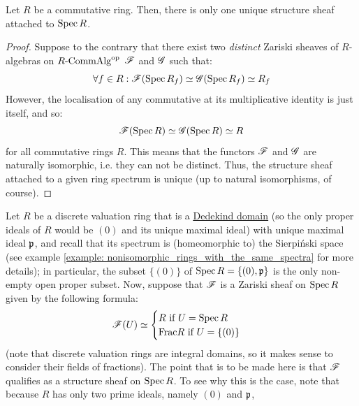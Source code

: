             \begin{proposition} \label{prop: structure_sheaf_uniqueness}
                Let $R$ be a commutative ring. Then, there is only one unique structure sheaf attached to $\operatorname{Spec} R$. 
            \end{proposition}
                \begin{proof}
                    Suppose to the contrary that there exist two \textit{distinct} Zariski sheaves of $R$-algebras on $R\text{-}\mathrm{Comm}\mathrm{Alg}^{\mathrm{op}}$ $\mathscr{F}$ and $\mathscr{G}$ such that:
                        $$\forall f \in R: \mathscr{F}(\operatorname{Spec} R_f) \simeq \mathscr{G}(\operatorname{Spec} R_f) \simeq R_f$$
                    However, the localisation of any commutative at its multiplicative identity is just itself, and so:
                        $$\mathscr{F}(\operatorname{Spec} R) \simeq \mathscr{G}(\operatorname{Spec} R) \simeq R$$
                    for all commutative rings $R$. This means that the functors $\mathscr{F}$ and $\mathscr{G}$ are naturally isomorphic, i.e. they can not be distinct. Thus, the structure sheaf attached to a given ring spectrum is unique (up to natural isomorphisms, of course).
                \end{proof}
                
            \begin{example}
                Let $R$ be a discrete valuation ring that is a \href{https://en.wikipedia.org/wiki/Dedekind_domain}{\underline{Dedekind domain}} (so the only proper ideals of $R$ would be $(0)$ and its unique maximal ideal) with unique maximal ideal $\mathfrak{p}$, and recall that its spectrum is (homeomorphic to) the Sierpi\'nski space (see example \ref{example: nonisomorphic_rings_with_the_same_spectra} for more details); in particular, the subset $\{(0)\}$ of $\operatorname{Spec} R = \{(0), \mathfrak{p}\}$ is the only non-empty open proper subset. Now, suppose that $\mathscr{F}$ is a Zariski sheaf on $\operatorname{Spec} R$ given by the following formula:
                    $$
                        \mathscr{F}(U) \simeq 
                        \begin{cases}
                            \text{$R$ if $U = \operatorname{Spec} R$}
                            \\
                            \text{$\mathrm{Frac} R$ if $U = \{(0)\}$}
                        \end{cases}
                    $$
                (note that discrete valuation rings are integral domains, so it makes sense to consider their fields of fractions). The point that is to be made here is that $\mathscr{F}$ qualifies as a structure sheaf on $\operatorname{Spec} R$. To see why this is the case, note that because $R$ has only two prime ideals, namely $(0)$ and $\mathfrak{p}$, 
            \end{example}
            
